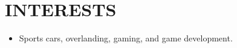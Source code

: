 \documentclass[letterpaper,11pt]{article}
\newcommand{\resumeItem}[1]{
  \item\small{
    {#1 \vspace{-1pt}}
  }
}
\newcommand{\resumeItemListStart}{\begin{itemize}[leftmargin=0.1in]}
\newcommand{\resumeItemListEnd}{\end{itemize}\vspace{-5pt}}
\begin{document}

   
%

\section{\color{airforceblue}INTERESTS}
  \resumeItemListStart
      \item[] Sports cars, overlanding, gaming, and game development.
  \resumeItemListEnd 
\vspace{-12pt}
\end{document}
